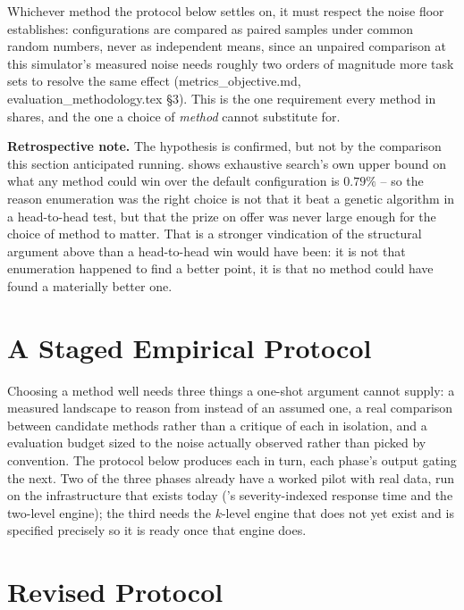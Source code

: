 \documentclass{article}
\begin{document}
Whichever method the protocol below settles on, it must respect the noise
floor  establishes: configurations are compared as paired
samples under common random numbers, never as independent means, since an
unpaired comparison at this simulator's measured noise needs roughly two
orders of magnitude more task sets to resolve the same effect
(metrics\_objective.md, evaluation\_methodology.tex \S3). This is the one
requirement every method in  shares, and the one a
choice of \emph{method} cannot substitute for.

\textbf{Retrospective note.} The hypothesis is confirmed, but not by the
comparison this section anticipated running. 
shows exhaustive search's own upper bound on what any method could win over
the default configuration is $0.79\%$ -- so the reason enumeration was the
right choice is not that it beat a genetic algorithm in a head-to-head test,
but that the prize on offer was never large enough for the choice of method to
matter. That is a stronger vindication of the structural argument above than a
head-to-head win would have been: it is not that enumeration happened to find
a better point, it is that no method could have found a materially better one.

\section{A Staged Empirical Protocol}
\label{sec:protocol}

Choosing a method well needs three things a one-shot argument cannot supply:
a measured landscape to reason from instead of an assumed one, a real
comparison between candidate methods rather than a critique of each in
isolation, and a evaluation budget sized to the noise actually observed
rather than picked by convention. The protocol below produces each in turn,
each phase's output gating the next. Two of the three phases already have a
worked pilot with real data, run on the infrastructure that exists today
('s severity-indexed response time and the two-level
engine); the third needs the $k$-level engine that does not yet exist and is
specified precisely so it is ready once that engine does.

\section{Revised Protocol}
\label{sec:revised-protocol}
\end{document}
